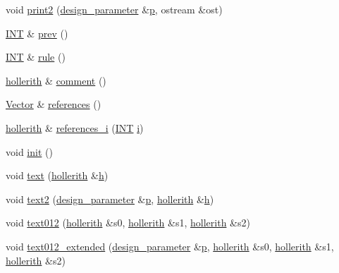 \begin{DoxyCompactItemize}
void \mbox{\hyperlink{classdesign__parameter__source_a5e22836b470986f95bfcb322dfc37e82}{print2}} (\mbox{\hyperlink{classdesign__parameter}{design\+\_\+parameter}} \&\mbox{\hyperlink{alphabet2_8_c_a533391314665d6bf1b5575e9a9cd8552}{p}}, ostream \&ost)
\item 
\mbox{\hyperlink{galois_8h_a09fddde158a3a20bd2dcadb609de11dc}{I\+NT}} \& \mbox{\hyperlink{classdesign__parameter__source_a886ad5916d9f3689afd6bda66a22cf7d}{prev}} ()
\item 
\mbox{\hyperlink{galois_8h_a09fddde158a3a20bd2dcadb609de11dc}{I\+NT}} \& \mbox{\hyperlink{classdesign__parameter__source_a8e9f2810222797d8cad1fc682bc447a3}{rule}} ()
\item 
\mbox{\hyperlink{classhollerith}{hollerith}} \& \mbox{\hyperlink{classdesign__parameter__source_ae34592d2aebfff0766c1605cd4a896ba}{comment}} ()
\item 
\mbox{\hyperlink{class_vector}{Vector}} \& \mbox{\hyperlink{classdesign__parameter__source_a012c498e42726a45397509d9c2fadf64}{references}} ()
\item 
\mbox{\hyperlink{classhollerith}{hollerith}} \& \mbox{\hyperlink{classdesign__parameter__source_ac47d57aab93b6dcc781d27c6cec0fe6e}{references\+\_\+i}} (\mbox{\hyperlink{galois_8h_a09fddde158a3a20bd2dcadb609de11dc}{I\+NT}} \mbox{\hyperlink{alphabet2_8_c_acb559820d9ca11295b4500f179ef6392}{i}})
\item 
void \mbox{\hyperlink{classdesign__parameter__source_afccf1773adfffec18fd96efaec208b93}{init}} ()
\item 
void \mbox{\hyperlink{classdesign__parameter__source_a9e8e88ae72c857cde0d30f7b97a742ac}{text}} (\mbox{\hyperlink{classhollerith}{hollerith}} \&\mbox{\hyperlink{alphabet2_8_c_a16611451551e3d15916bae723c3f59f7}{h}})
\item 
void \mbox{\hyperlink{classdesign__parameter__source_a729d62efa57d73e420470d47902c4bf2}{text2}} (\mbox{\hyperlink{classdesign__parameter}{design\+\_\+parameter}} \&\mbox{\hyperlink{alphabet2_8_c_a533391314665d6bf1b5575e9a9cd8552}{p}}, \mbox{\hyperlink{classhollerith}{hollerith}} \&\mbox{\hyperlink{alphabet2_8_c_a16611451551e3d15916bae723c3f59f7}{h}})
\item 
void \mbox{\hyperlink{classdesign__parameter__source_afa2c39e6ed9f674b1c21c39f9a6a392a}{text012}} (\mbox{\hyperlink{classhollerith}{hollerith}} \&s0, \mbox{\hyperlink{classhollerith}{hollerith}} \&s1, \mbox{\hyperlink{classhollerith}{hollerith}} \&s2)
\item 
void \mbox{\hyperlink{classdesign__parameter__source_afa19c645725011722b75da5dee8b0945}{text012\+\_\+extended}} (\mbox{\hyperlink{classdesign__parameter}{design\+\_\+parameter}} \&\mbox{\hyperlink{alphabet2_8_c_a533391314665d6bf1b5575e9a9cd8552}{p}}, \mbox{\hyperlink{classhollerith}{hollerith}} \&s0, \mbox{\hyperlink{classhollerith}{hollerith}} \&s1, \mbox{\hyperlink{classhollerith}{hollerith}} \&s2)
\end{DoxyCompactItemize}
